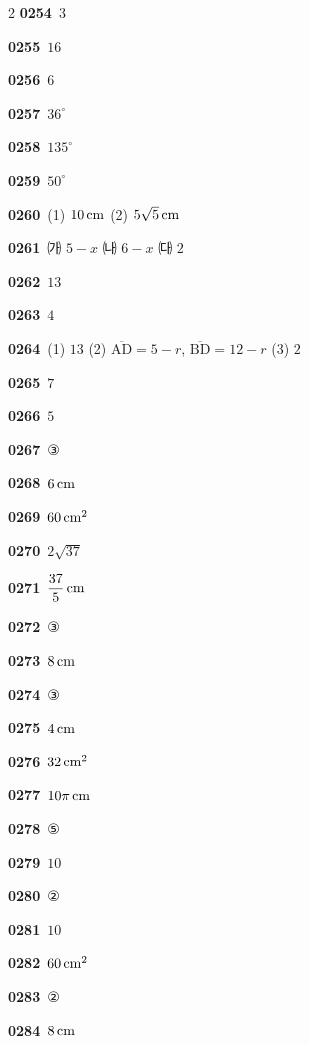 \documentclass[10pt,a4paper]{article}
\newcommand{\seg}[1]{\overline{\mathrm{#1}}}
\begin{document}
\begin{multicols}{2}
\noindent\textbf{0254}\ $3$\par
\noindent\textbf{0255}\ $16$\par
\noindent\textbf{0256}\ $6$\par
\noindent\textbf{0257}\ $36^\circ$\par
\noindent\textbf{0258}\ $135^\circ$\par
\noindent\textbf{0259}\ $50^\circ$\par
\noindent\textbf{0260}\ (1) $10\mkern3mu \mathrm{cm}$ (2) $5\sqrt{5}\mkern3mu \mathrm{cm}$\par
\noindent\textbf{0261}\ ㈎ $5-x$ \quad ㈏ $6-x$ \quad ㈐ $2$\par
\noindent\textbf{0262}\ $13$\par
\noindent\textbf{0263}\ $4$\par
\noindent\textbf{0264}\ (1) $13$ (2) $\seg{AD}=5-r$, $\seg{BD}=12-r$ (3) $2$\par
\noindent\textbf{0265}\ $7$\par
\noindent\textbf{0266}\ $5$\par
\noindent\textbf{0267}\ ③\par
\noindent\textbf{0268}\ $6\mkern3mu \mathrm{cm}$\par
\noindent\textbf{0269}\ $60\mkern3mu \mathrm{cm}^2$\par
\noindent\textbf{0270}\ $2\sqrt{37}$\par
\noindent\textbf{0271}\ $\dfrac{37}{5}\mkern3mu \mathrm{cm}$\par
\noindent\textbf{0272}\ ③\par
\noindent\textbf{0273}\ $8\mkern3mu \mathrm{cm}$\par
\noindent\textbf{0274}\ ③\par
\noindent\textbf{0275}\ $4\mkern3mu \mathrm{cm}$\par
\noindent\textbf{0276}\ $32\mkern3mu \mathrm{cm}^2$\par
\noindent\textbf{0277}\ $10\pi\mkern3mu \mathrm{cm}$\par
\noindent\textbf{0278}\ ⑤\par
\noindent\textbf{0279}\ $10$\par
\noindent\textbf{0280}\ ②\par
\noindent\textbf{0281}\ $10$\par
\noindent\textbf{0282}\ $60\mkern3mu \mathrm{cm}^2$\par
\noindent\textbf{0283}\ ②\par
\noindent\textbf{0284}\ $8\mkern3mu \mathrm{cm}$\par

\end{multicols}
\end{document}
